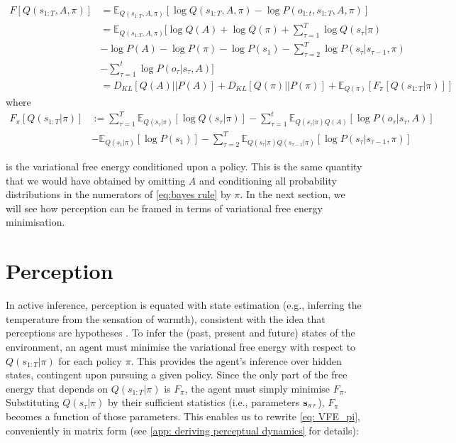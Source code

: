 \documentclass[review,12pt,authoryear]{elsarticle}
\newcommand{\E}{\mathbb E}
\begin{document}
  	\begin{equation}
  	\label{eq: computing VFE}
  	    \begin{split}
  	        F[Q(s_{1:T},A, \pi)]&= \E_{Q(s_{1:T},A, \pi)}[\log Q(s_{1:T},A, \pi) - \log P(o_{1:t},s_{1:T},A, \pi)] \\
  	        &= \E_{Q(s_{1:T},A, \pi)}[\log Q(A) +  \log Q(\pi)+\sum_{\tau = 1}^T  \log Q(s_\tau|\pi) \\
  	        &-\log P(A) -\log P(\pi)- \log P(s_1)- \sum_{\tau =2}^T\log P(s_\tau |s_{\tau-1},\pi)\\
  	        &-\sum_{\tau = 1}^t \log P(o_{\tau}|s_{\tau},A)] \\
  	        &=D_{KL}[Q(A)||P(A)]+D_{KL}[Q(\pi)||P(\pi)]+\E_{Q(\pi)}[F_\pi[Q(s_{1:T}|\pi)]]
  	    \end{split}
  	\end{equation}
where
\begin{equation}
  	\label{eq: VFE_pi}
  	    \begin{split}
  	        F_\pi[Q(s_{1:T}|\pi)] & := \sum_{\tau =1}^T\E_{Q(s_\tau |\pi)}[\log Q(s_\tau |\pi)] -\sum_{\tau = 1}^t \E_{Q(s_\tau |\pi)Q(A)}[\log P(o_{\tau}|s_{\tau},A)] \\
  	        &-\E_{Q(s_1 |\pi)}[\log P(s_1)]-\sum_{\tau =2}^T \E_{Q(s_\tau |\pi)Q(s_{\tau-1} |\pi)}[\log P(s_\tau |s_{\tau-1},\pi)]
      	    \end{split}
  	\end{equation}
  	
is the variational free energy conditioned upon a policy. This is the same quantity that we would have obtained by omitting $A$ and conditioning all probability distributions in the numerators of \eqref{eq:bayes rule} by $\pi$. In the next section, we will see how perception can be framed in terms of variational free energy minimisation.

\section{Perception}

In active inference, perception is equated with state estimation \citep{fristonActiveInferenceProcess2017} (e.g., inferring the temperature from the sensation of warmth), consistent with the idea that perceptions are hypotheses \citep{gregoryPerceptionsHypotheses1980}. To infer the (past, present and future) states of the environment, an agent must minimise the variational free energy with respect to $Q(s_{1:T}|\pi)$ for each policy $\pi$. This provides the agent’s inference over hidden states, contingent upon pursuing a given policy. Since the only part of the free energy that depends on $Q(s_{1:T}|\pi)$ is $F_\pi$, the agent must simply minimise $F_\pi$. 
Substituting $Q(s_{\tau}|\pi)$ by their sufficient statistics (i.e., parameters $\bold s_{\pi \tau}$), $F_\pi$ becomes a function of those parameters. This enables us to rewrite \eqref{eq: VFE_pi}, conveniently in matrix form (see \ref{app: deriving perceptual dynamics} for details):
\end{document}

